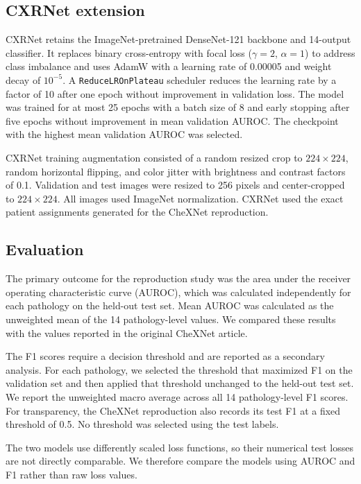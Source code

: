 \subsection{CXRNet extension}

CXRNet retains the ImageNet-pretrained DenseNet-121 backbone and 14-output
classifier. It replaces binary cross-entropy with focal loss
($\gamma=2$, $\alpha=1$) to address class imbalance and uses AdamW with a
learning rate of 0.00005 and weight decay of $10^{-5}$. A
\texttt{ReduceLROnPlateau} scheduler reduces the learning rate by a factor of
10 after one epoch without improvement in validation loss. The model was
trained for at most 25 epochs with a batch size of 8 and early stopping after
five epochs without improvement in mean validation AUROC. The checkpoint with
the highest mean validation AUROC was selected.

CXRNet training augmentation consisted of a random resized crop to
$224\times224$, random horizontal flipping, and color jitter with brightness
and contrast factors of 0.1. Validation and test images were resized to 256
pixels and center-cropped to $224\times224$. All images used ImageNet
normalization. CXRNet used the exact patient assignments generated for the
CheXNet reproduction.

\subsection{Evaluation}

The primary outcome for the reproduction study was the area under the receiver operating 
characteristic curve (AUROC), which was calculated independently for each pathology 
on the held-out test set. Mean AUROC was calculated as the unweighted mean of the 14 pathology-level 
values. We compared these results with the values reported in the original CheXNet article.

The F1 scores require a decision threshold and are reported as a secondary analysis. For
each pathology, we selected the threshold that maximized F1 on the validation
set and then applied that threshold unchanged to the held-out test set. We
report the unweighted macro average across all 14 pathology-level F1 scores.
For transparency, the CheXNet reproduction also records its test F1 at a fixed
threshold of 0.5. No threshold was selected using the test labels.

The two models use differently scaled loss functions, so their numerical test
losses are not directly comparable. We therefore compare the models using
AUROC and F1 rather than raw loss values.

